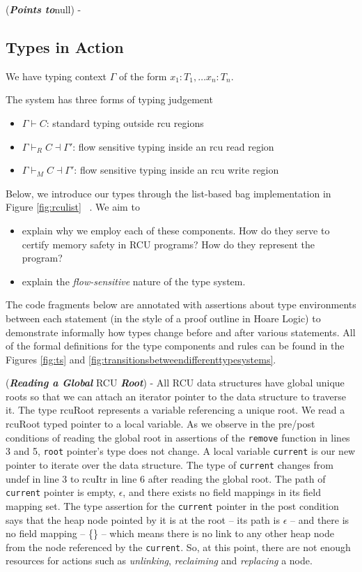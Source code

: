 (\textit{\textbf{Points to}}\textsf{null}) - 
\subsection{Types in Action}
\label{subsection:type-action}
We have typing context $\Gamma$ of the form $x_1 : T_1, \ldots x_n : T_n$.

The system has three forms of typing judgement
\begin{itemize}
\item $\Gamma \vdash C$: standard typing outside rcu regions
\item $\Gamma \vdash_R C \dashv \Gamma'$: flow sensitive typing inside an rcu read region
\item $\Gamma \vdash_M C \dashv \Gamma'$: flow sensitive typing inside an rcu write region
\end{itemize}
Below, we introduce our types through the list-based bag implementation in Figure \ref{fig:rculist} ~\cite{McKenney2015SomeEO}.  We aim to
\begin{itemize}
\item explain why we employ each of these components. How do they serve to certify memory safety in \textsf{RCU} programs? How do they represent the program?
\item explain the \textit{flow-sensitive} nature of the type system. 
\end{itemize}
The code fragments below are annotated with assertions about type environments between each statement (in the style of a proof outline in Hoare Logic) to demonstrate informally how types change before and after various statements. All of the formal definitions for the type components and rules can be found in the Figures \ref{fig:ts} and \ref{fig:transitionsbetweendifferenttypesystems}.

(\textit{\textbf{Reading a Global}} \textsf{RCU} \textit{\textbf{Root}}) - All \textsf{RCU} data structures have global unique roots so that we can attach an iterator pointer to the data structure to traverse it. The type \textsf{rcuRoot} represents a variable referencing a unique root. We read a \textsf{rcuRoot} typed pointer to a local variable. As we observe in the pre/post conditions of reading the global root in assertions of the \texttt{remove} function in lines 3 and 5, \texttt{root} pointer's type does not change. A local variable \texttt{current} is our new pointer to iterate over the data structure. The type of \texttt{current} changes from \textsf{undef} in line 3 to \textsf{rcuItr} in line 6 after reading the global root. The path of \texttt{current} pointer is empty, $\epsilon$, and there exists no field mappings in its field mapping set.  The type assertion for the \texttt{current} pointer in the post condition says that the heap node pointed by it is at the root -- its path is $\epsilon$ -- and there is no field mapping -- \{\}  -- which means there is no link to any other heap node from the node referenced by the \texttt{current}. So, at this point, there are not enough resources for actions such as \textit{unlinking}, \textit{reclaiming} and \textit{replacing} a node.

